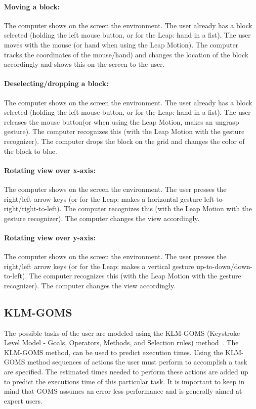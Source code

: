 \paragraph{Moving a block:} The computer shows on the screen the environment. The user already has a block selected (holding the left mouse button, or for the Leap: hand in a 
fist). The user moves with the mouse (or hand when using the Leap Motion). The computer tracks the coordinates of the mouse/hand) and changes the location of the block accordingly 
and shows this on the screen to the user. 
\paragraph{Deselecting/dropping a block:} The computer shows on the screen the environment. The user already has a block selected (holding the left mouse button, or for the Leap: 
hand in a fist). The user releases the mouse button(or when using the Leap Motion, makes an ungrasp gesture). The computer recognizes this (with the Leap Motion with the gesture 
recognizer). The computer drops the block on the grid and changes the color of the block to blue.
\paragraph{Rotating view over x-axis:} The computer shows on the screen the environment. The user presses the right/left arrow keys (or for the Leap: makes a horizontal gesture 
left-to-right/right-to-left). The computer recognizes this (with the Leap Motion with the gesture recognizer). The computer changes the view accordingly.
\paragraph{Rotating view over y-axis:} The computer shows on the screen the environment. The user presses the right/left arrow keys (or for the Leap: makes a vertical gesture 
up-to-down/down-to-left). The computer recognizes this (with the Leap Motion with the gesture recognizer). The computer changes the view accordingly.


\subsection{KLM-GOMS}
The possible tasks of the user are modeled using the KLM-GOMS (Keystroke Level Model - Goals, Operators, Methods, and Selection rules) method~\cite{john1996goms}. 
The KLM-GOMS method, can be used to predict execution times. Using the KLM-GOMS method sequences of actions the user must perform to accomplish a task are specified. 
The estimated times needed to perform these actions are added up to predict the executions time of this particular task. It is important to keep in mind that GOMS assumes 
an error less performance and is generally aimed at expert users.

